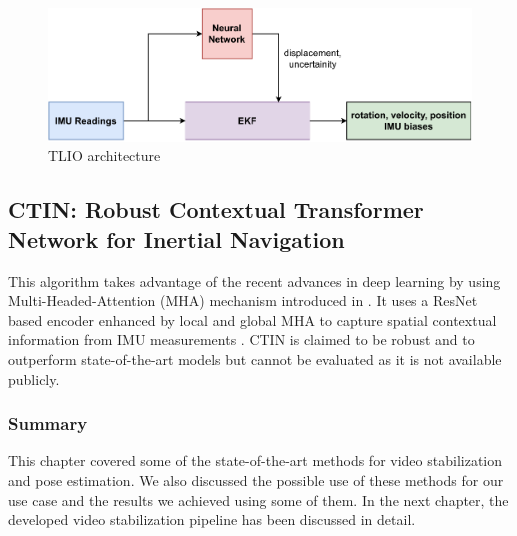 \begin{figure}[H]
    \centering
    \includegraphics[scale=0.8]{images/fig_chapter3/tlio.pdf}
    \caption{TLIO architecture}
    \label{fig:tlio}
\end{figure}

\subsection{CTIN: Robust Contextual Transformer Network for Inertial Navigation}
This algorithm takes advantage of the recent advances in deep learning by using Multi-Headed-Attention (MHA) mechanism introduced in \citep{vaswani2017attention}. It uses a ResNet based encoder enhanced by local and global MHA to capture spatial contextual information from IMU measurements \citep{rao2022ctin}. CTIN is claimed to be robust and to outperform state-of-the-art models but cannot be evaluated as it is not available publicly.


\subsubsection{Summary}

This chapter covered some of the state-of-the-art methods for video stabilization and pose estimation. We also discussed the possible use of these methods for our use case and the results we achieved using some of them. In the next chapter, the developed video stabilization pipeline has been discussed in detail.
